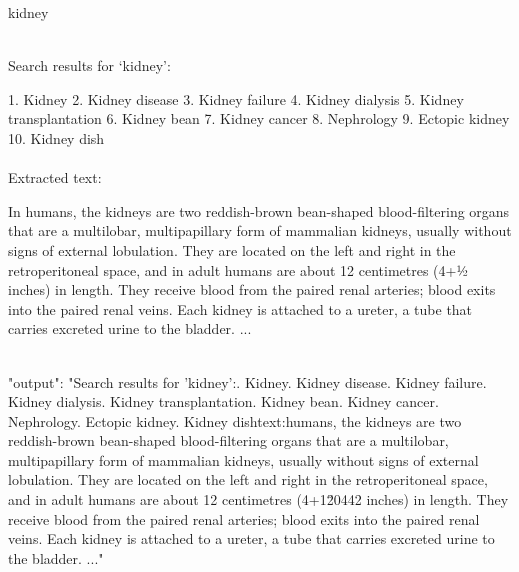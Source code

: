 \begin{textcolorbox}
kidney
\\\\

Search results for `kidney':

1. Kidney
2. Kidney disease
3. Kidney failure
4. Kidney dialysis
5. Kidney transplantation
6. Kidney bean
7. Kidney cancer
8. Nephrology
9. Ectopic kidney
10. Kidney dish
\\\\
Extracted text:

In humans, the kidneys are two reddish-brown bean-shaped blood-filtering organs that are a multilobar, multipapillary form of mammalian kidneys, usually without signs of external lobulation. They are located on the left and right in the retroperitoneal space, and in adult humans are about 12 centimetres (4+1⁄2 inches) in length. They receive blood from the paired renal arteries; blood exits into the paired renal veins. Each kidney is attached to a ureter, a tube that carries excreted urine to the bladder.
...
\\\\
\begin{codebox}
{
    "output": "Search results for 'kidney':. Kidney. Kidney disease. Kidney failure. Kidney dialysis. Kidney transplantation. Kidney bean. Kidney cancer. Nephrology. Ectopic kidney. Kidney dish\n\nExtracted text:\nIn humans, the kidneys are two reddish-brown bean-shaped blood-filtering organs that are a multilobar, multipapillary form of mammalian kidneys, usually without signs of external lobulation. They are located on the left and right in the retroperitoneal space, and in adult humans are about 12 centimetres (4+1\u20442 inches) in length. They receive blood from the paired renal arteries; blood exits into the paired renal veins. Each kidney is attached to a ureter, a tube that carries excreted urine to the bladder. ..."
}
\end{codebox}

\end{textcolorbox}